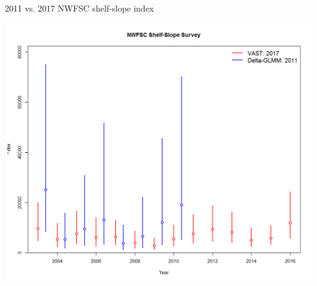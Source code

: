 \documentclass[pdf]{beamer}\usepackage[]{graphicx}\usepackage[]{color}
\begin{document}
\begin{frame}{2011 vs. 2017 NWFSC shelf-slope index}
  \begin{center}
    \includegraphics[scale = 0.20]{figures/NWFSC_shelf_slope_2011_2017.png}
  \end{center}
\end{frame} 
  
\end{document}
